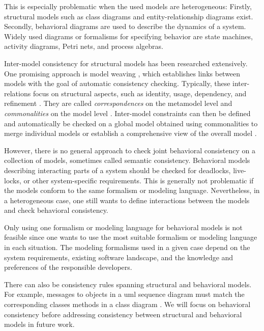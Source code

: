 \documentclass[conference]{IEEEtran}
\begin{document}
This is especially problematic when the used models are heterogeneous:
Firstly, structural models such as class diagrams and entity-relationship diagrams exist.
Secondly, behavioral diagrams are used to describe the dynamics of a system.
Widely used diagrams or formalisms for specifying behavior are state machines, activity diagrams, Petri nets, and process algebras.

Inter-model consistency for structural models has been researched extensively.
One promising approach is model weaving \cite{bezivinCanonicalSchemeModel2006}, which establishes links between models with the goal of automatic consistency checking.
Typically, these inter-relations focus on structural aspects, such as identity, usage, dependency, and refinement \cite{feldmannManagingIntermodelInconsistencies2019, torresSystematicLiteratureReview2020}.
They are called \textit{correspondences} on the metamodel level and \textit{commonalities} on the model level \cite{stunkelMultipleModelSynchronization2020, klareCommonalitiesPreservingConsistency2019}.
Inter-model constraints can then be defined and automatically be checked on a global model obtained using commonalities to merge individual models \cite{stunkelMultimodelCorrespondenceIntermodel2018} or establish a comprehensive view of the overall model \cite{stunkelMultipleModelSynchronization2020}.

However, there is no general approach to check joint behavioral consistency on a collection of models, sometimes called semantic consistency.
Behavioral models describing interacting parts of a system should be checked for deadlocks, live-locks, or other system-specific requirements.
This is generally not problematic if the models conform to the same formalism or modeling language.
Nevertheless, in a heterogeneous case, one still wants to define interactions between the models and check behavioral consistency.

Only using one formalism or modeling language for behavioral models is not feasible since one wants to use the most suitable formalism or modeling language in each situation.
The modeling formalisms used in a given case depend on the system requirements, existing software landscape, and the knowledge and preferences of the responsible developers. 

There can also be consistency rules spanning structural and behavioral models.
For example, messages to objects in a \gls{uml} sequence diagram must match the corresponding classes methods in a class diagram \cite{egyedFixingInconsistenciesUML2007}.
We will focus on behavioral consistency before addressing consistency between structural and behavioral models in future work. 
\end{document}
